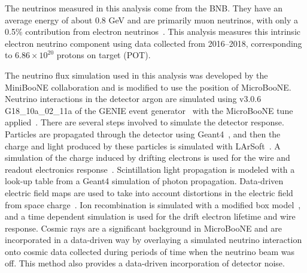 \documentclass[reprint,
 amsmath,amssymb,
 aps,prd,
 superscriptaddress,
 twocolumn, longbibliography
]{revtex4-1}
\begin{document}
The neutrinos measured in this analysis come from the BNB.  They have an average energy of about 0.8 GeV and are primarily muon neutrinos, with only a 0.5\% contribution from electron neutrinos~\cite{mbflux}.  This analysis measures this intrinsic electron neutrino component using data collected from 2016--2018, corresponding to $6.86 \times 10^{20}$ protons on target (POT).

The neutrino flux simulation used in this analysis was developed by the MiniBooNE collaboration \cite{mbflux} and is modified to use the position of MicroBooNE.  Neutrino interactions in the detector argon are simulated using v3.0.6 G18\_10a\_02\_11a of the GENIE event generator~\cite{GENIEv3} with the MicroBooNE tune applied~\cite{ubtune}. 
There are several steps involved to simulate the detector response.  Particles are propagated through the detector using Geant4~\cite{geant4}, and then the charge and light produced by these particles is simulated with LArSoft~\cite{LArSoft}.  A simulation of the charge induced by drifting electrons is used for the wire and readout electronics response~\cite{ubsig1,ubsig2}.  Scintillation light propagation is modeled with a look-up table from a Geant4 simulation of photon propagation.  Data-driven electric field maps are used to take into account distortions in the electric field from space charge~\cite{ubefield,efieldcosmics}.  Ion recombination is simulated with a modified box model~\cite{argoneutrecomb}, and a time dependent simulation is used for the drift electron lifetime and wire response.  Cosmic rays are a significant background in MicroBooNE and are incorporated in a data-driven way by overlaying a simulated neutrino interaction onto cosmic data collected during periods of time when the neutrino beam was off.  This method also provides a data-driven incorporation of detector noise. 
\end{document}
